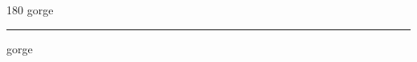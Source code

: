 
\begin{frame}
\begin{center}
\begin{turn}{180}
{\fontsize{2.5cm}{1em}\selectfont gorge}
\end{turn}
\vspace{1em}\par  
\hrule
\vspace{1em}\par  
{\fontsize{2.5cm}{1em}\selectfont gorge}
\end{center}
\end{frame}

